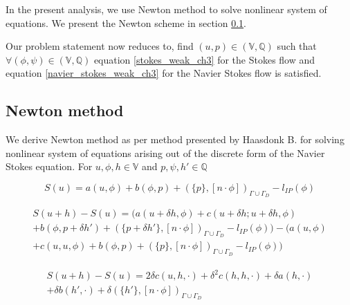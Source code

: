 \documentclass[a4paper]{book}
\begin{document}
In the present analysis, we use Newton method to solve nonlinear system of equations. We present the Newton scheme in section \ref{newton_method}. 

Our problem statement now reduces to, find $(u,p) \in (\mathbb{V},\mathbb{Q})$ such that $\forall (\phi,\psi) \in (\mathbb{V},\mathbb{Q})$ equation \ref{stokes_weak_ch3} for the Stokes flow and equation \ref{navier_stokes_weak_ch3} for the Navier Stokes flow is satisfied.

\subsection{Newton method} \label{newton_method}

We derive Newton method as per method presented by Haasdonk B. \cite{Haasdonk} for solving nonlinear system of equations arising out of the discrete form of the Navier Stokes equation. For $u, \phi , h \in \mathbb{V}$ and $p, \psi , h' \in \mathbb{Q}$ \\
\begin{flushleft}
\begin{equation}
S(u) = a(u,\phi) + b(\phi,p) + (\{p\},[n\cdot \phi])_{\Gamma \cup \Gamma_D} - l_{IP}(\phi)
\end{equation}
\end{flushleft}

\begin{flushleft}
\begin{equation}
\begin{split}
S(u+h) - S(u) = (a(u+\delta h,\phi) + c(u + \delta h;u + \delta h,\phi)\\ + b(\phi,p+\delta h') + (\{p+\delta h'\},[n\cdot \phi])_{\Gamma \cup \Gamma_D} - l_{IP}(\phi)) - (a(u,\phi)\\ + c(u,u,\phi) + b(\phi,p) + (\{p\},[n\cdot \phi])_{\Gamma \cup \Gamma_D} - l_{IP}(\phi))
\end{split}
\end{equation}
\end{flushleft}

\begin{flushleft}
\begin{equation}
\begin{split}
S(u+h) - S(u) = 2\delta c(u,h,\cdot) + \delta^2 c(h,h,\cdot) + \delta a(h,\cdot)\\ + \delta b(h',\cdot) + \delta (\{h'\},[n\cdot \phi])_{\Gamma \cup \Gamma_D}
\end{split}
\end{equation}
\end{flushleft}
\end{document}
